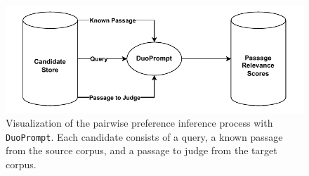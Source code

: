 \begin{figure}[t]
    \centering
    \includegraphics[width=\textwidth]{./graphics/drawio/pairwise_preferences.pdf}
    \caption{Visualization of the pairwise preference inference process with \texttt{DuoPrompt}. Each candidate consists of a query, a known passage from the source corpus, and a passage to judge from the target corpus.}
    \label{fig:pairwise-preferences}
\end{figure}

